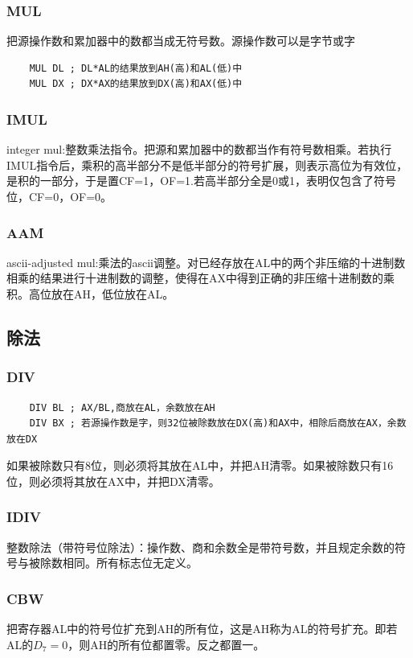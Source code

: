 \subsubsection{MUL}
把源操作数和累加器中的数都当成无符号数。源操作数可以是字节或字
\begin{lstlisting}
    MUL DL ; DL*AL的结果放到AH(高)和AL(低)中
    MUL DX ; DX*AX的结果放到DX(高)和AX(低)中
\end{lstlisting}
\subsubsection{IMUL}
integer mul:整数乘法指令。把源和累加器中的数都当作有符号数相乘。若执行IMUL指令后，乘积的高半部分不是低半部分的符号扩展，则表示高位为有效位，是积的一部分，于是置CF=1，OF=1.若高半部分全是0或1，表明仅包含了符号位，CF=0，OF=0。
\subsubsection{AAM}
ascii-adjusted mul:乘法的ascii调整。对已经存放在AL中的两个非压缩的十进制数相乘的结果进行十进制数的调整，使得在AX中得到正确的非压缩十进制数的乘积。高位放在AH，低位放在AL。
\subsection{除法}
\subsubsection{DIV}
\begin{lstlisting}
    DIV BL ; AX/BL,商放在AL，余数放在AH
    DIV BX ; 若源操作数是字，则32位被除数放在DX(高)和AX中，相除后商放在AX，余数放在DX
\end{lstlisting}
如果被除数只有8位，则必须将其放在AL中，并把AH清零。如果被除数只有16位，则必须将其放在AX中，并把DX清零。{\color{red}{DIV执行后，所有标志无定义}}
\subsubsection{IDIV}
整数除法（带符号位除法）：操作数、商和余数全是带符号数，并且规定余数的符号与被除数相同。所有标志位无定义。

{\color{red}{若被除数的高位绝对值大于除数的绝对值，也即商数超过了目标寄存器所能存放的数的范围，则计算机会出现除法错中断，商和余数不确定}}
\subsubsection{CBW}
把寄存器AL中的符号位扩充到AH的所有位，这是AH称为AL的符号扩充。即若AL的$D_7=0$，则AH的所有位都置零。反之都置一。
